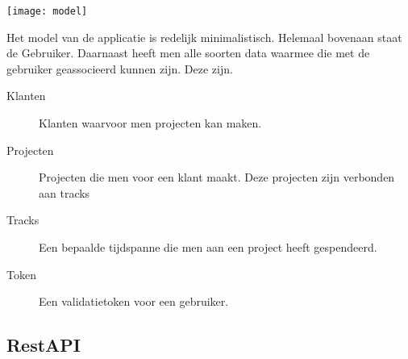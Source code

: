 \documentclass[a4paper,11pt]{article}
\begin{document}
\begin{center}
\begin{minipage}{\linewidth}
\centering
\texttt{[image: model]}
\end{minipage}
\end{center}

Het model van de applicatie is redelijk minimalistisch. Helemaal bovenaan staat de Gebruiker. Daarnaast heeft men alle soorten data waarmee die met de gebruiker geassocieerd kunnen zijn. Deze zijn.
\begin{description}
\item[Klanten] Klanten waarvoor men projecten kan maken.
\item[Projecten] Projecten die men voor een klant maakt. Deze projecten zijn verbonden aan tracks
\item[Tracks] Een bepaalde tijdspanne die men aan een project heeft gespendeerd.
\item[Token] Een validatietoken voor een gebruiker.
\end{description}

\subsection{RestAPI}
%
%
%
\end{document}
